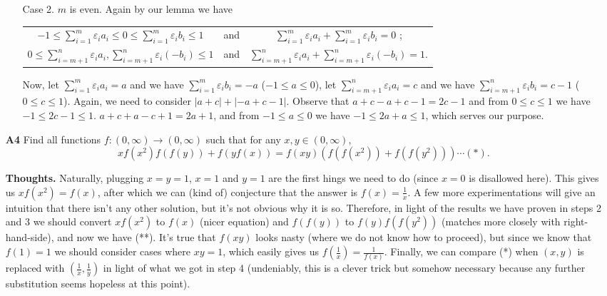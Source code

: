 \documentclass[11pt,a4paper]{article}
\begin{document}
\begin{itemize}
\begin{itemize}
\item [Case 2.] $m$ is even. 
 Again by our lemma we have 
\begin{center}
\begin{tabular}{c c c} 
$-1\le \sum_{i=1}^m \varepsilon_i a_i\le 0\le \sum_{i=1}^m \varepsilon_i b_i\le 1$
& and & $\sum_{i=1}^m \varepsilon_i a_i +\sum_{i=1}^m \varepsilon_i b_i=0$ ; \\ 
$0\le \sum_{i=m+1}^n \varepsilon_i a_i,  \sum_{i=m+1}^n \varepsilon_i (-b_i)\le 1$
& and & $\sum_{i=m+1}^n \varepsilon_i a_i +\sum_{i=m+1}^n \varepsilon_i (-b_i)=1$. \\ 
\end{tabular} 
\end{center}
Now, let $\sum_{i=1}^m \varepsilon_i a_i=a$ and we have $\sum_{i=1}^m \varepsilon_i b_i=-a$ ($-1\le a\le 0$), 
let $\sum_{i=m+1}^n \varepsilon_i a_i=c$ and we have $\sum_{i=m+1}^n \varepsilon_i b_i=c-1$ ($0\le c\le 1$). 
Again, we need to consider $|a+c|+|-a+c-1|$. 
Observe that $a+c-a+c-1=2c-1$ and from $0\le c\le 1$ we have $-1\le 2c-1\le 1$. 
$a+c+a-c+1=2a+1$, and from $-1\le a\le 0$ we have $-1\le 2a+a\le 1$, which serves our purpose. 
\end{itemize}

\newpage
\item[\textbf{A4}]
Find all functions $f:(0,\infty)\rightarrow (0,\infty)$ such that for any $x,y\in (0,\infty)$, $$xf(x^2)f(f(y)) + f(yf(x)) = f(xy) \left(f(f(x^2)) + f(f(y^2))\right)\cdots (*).$$

\textbf{Thoughts.} Naturally, plugging $x=y=1$, $x=1$ and $y=1$ are the first hings we need to do (since $x=0$ is disallowed here). 
This gives us $xf(x^2)=f(x)$, after which we can (kind of) conjecture that the answer is $f(x)=\frac 1x$. 
A few more experimentations will give an intuition that there isn't any other solution, but it's not obvious why it is so. 
Therefore, in light of the results we have proven in steps 2 and 3 we should convert $xf(x^2)$ to $f(x)$ (nicer equation) and $f(f(y))$ to $f(y)f(f(y^2))$ (matches more closely with right-hand-side), and now we have (**). 
It's true that $f(xy)$ looks nasty (where we do not know how to proceed), but since we know that $f(1)=1$ we should consider cases where $xy=1$, which easily gives us $f(\frac 1x)=\frac 1{f(x)}$. 
Finally, we can compare (*) when $(x, y)$ is replaced with $(\frac 1x, \frac 1y)$ in light of what we got in step 4 (undeniably, this is a clever trick but somehow necessary because any further substitution seems hopeless at this point). 


\end{itemize}
\end{document}
